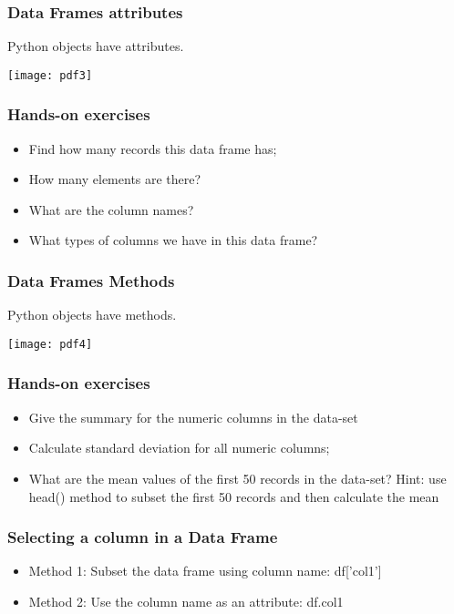 \begin{frame}[fragile]
\frametitle{Data Frames attributes}
Python objects have attributes.
\begin{center}
\texttt{[image: pdf3]}
\end{center}

\end{frame}


\begin{frame}[fragile]
\frametitle{Hands-on exercises}
\begin{itemize}
\item Find how many records this data frame has;
\item How many elements are there?     
\item What are the column names?
\item What types of columns we have in this data frame?
\end{itemize}

\end{frame}


\begin{frame}[fragile]
\frametitle{Data Frames Methods}
Python objects have methods.
\begin{center}
\texttt{[image: pdf4]}
\end{center}

\end{frame}

\begin{frame}[fragile]
\frametitle{Hands-on exercises}
\begin{itemize}
\item Give the summary for the numeric columns in the data-set
\item Calculate standard deviation for all numeric columns;
\item What are the mean values of the first 50 records in the data-set?   Hint: use head() method to subset the first 50 records and then calculate the mean
\end{itemize}

\end{frame}

\begin{frame}[fragile]
\frametitle{Selecting a column in a Data Frame}
\begin{itemize}
\item Method 1:   Subset the data frame using column name:
                      df['col1']

\item Method 2:   Use the column name as an attribute:
                      df.col1

\end{itemize}

\end{frame}

